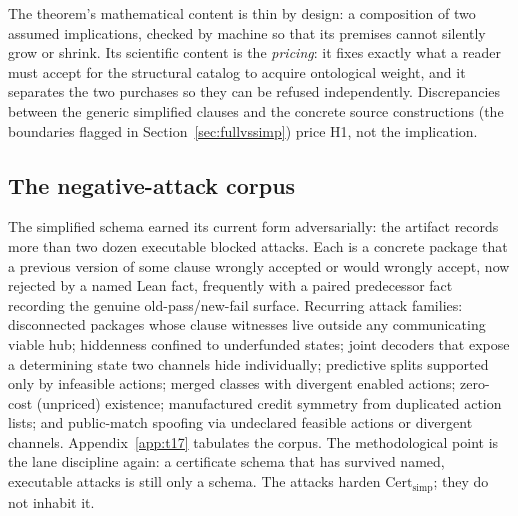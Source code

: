 \documentclass[11pt]{article}
\newcommand{\Certsimp}{\mathrm{Cert}_{\mathrm{simp}}}
\theoremstyle{definition}
\begin{document}
The theorem's mathematical content is thin by design: a
composition of two assumed implications, checked by machine so that its
premises cannot silently grow or shrink. Its scientific content is the
\emph{pricing}: it fixes exactly what a reader must accept for the structural
catalog to acquire ontological weight, and it separates the two purchases so
they can be refused independently. Discrepancies between the generic
simplified clauses and the concrete source constructions (the boundaries
flagged in Section~\ref{sec:fullvssimp}) price H1, not the implication.

\subsection{The negative-attack corpus}

The simplified schema earned its current form adversarially: the artifact
records more than two dozen executable blocked attacks. Each is a concrete
package that a previous version of some clause wrongly accepted or would
wrongly accept, now rejected by a named Lean fact, frequently with a paired
predecessor fact recording the genuine old-pass/new-fail surface. Recurring
attack families: disconnected packages whose clause witnesses live outside
any communicating viable hub; hiddenness confined to underfunded states;
joint decoders that expose a determining state two channels hide
individually; predictive splits supported only by infeasible actions; merged
classes with divergent enabled actions; zero-cost (unpriced) existence;
manufactured credit symmetry from duplicated action lists; and
public-match spoofing via undeclared feasible actions or divergent channels.
Appendix~\ref{app:t17} tabulates the corpus. The methodological point is the
lane discipline again: a certificate schema that has survived named,
executable attacks is still only a schema. The attacks harden $\Certsimp$;
they do not inhabit it.
\end{document}
